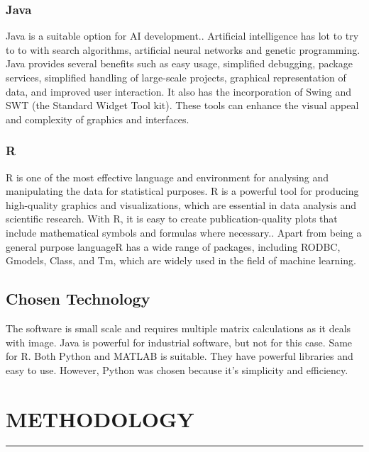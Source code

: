 \documentclass[12pt,a4paper]{report}
\begin{document}
\subsection{Java}
\justify Java is a suitable option for AI development.. Artificial intelligence has lot to try to to with search algorithms, artificial neural networks and genetic programming. Java provides several benefits such as easy usage, simplified debugging, package services, simplified handling of large-scale projects, graphical representation of data, and improved user interaction. It also has the incorporation of Swing and SWT (the Standard Widget Tool kit). These tools can enhance the visual appeal and complexity of graphics and interfaces.
\subsection{R}
\justify R is one of the most effective language and environment for analysing and manipulating the data for statistical purposes. R is a powerful tool for producing high-quality graphics and visualizations, which are essential in data analysis and scientific research. With R, it is easy to create publication-quality plots that include mathematical symbols and formulas where necessary.. Apart from being a general purpose languageR has a wide range of packages, including RODBC, Gmodels, Class, and Tm, which are widely used in the field of machine learning.\\
	\section{Chosen Technology}
	\justify The software is small scale and requires multiple matrix calculations as it deals with image. Java is powerful for industrial software, but not for this case. Same for R.
	\justify Both Python and MATLAB is suitable. They have powerful libraries and easy to use. However, Python was chosen because it's simplicity and efficiency.
	
	\newpage
	\chapter{METHODOLOGY}
	\rule{14.6cm}{.05cm}
	
\end{document}
